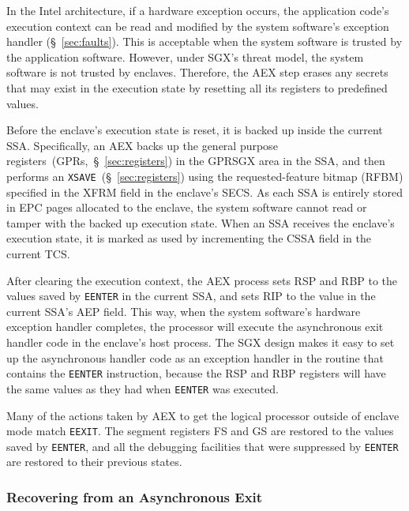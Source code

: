 In the Intel architecture, if a hardware exception occurs, the application
code's execution context can be read and modified by the system software's
exception handler (\S~\ref{sec:faults}). This is acceptable when the system
software is trusted by the application software. However, under SGX's threat
model, the system software is not trusted by enclaves. Therefore, the AEX step
erases any secrets that may exist in the execution state by resetting all its
registers to predefined values.

Before the enclave's execution state is reset, it is backed up inside the
current SSA. Specifically, an AEX backs up the general purpose
registers~(GPRs,~\S~\ref{sec:registers}) in the GPRSGX area in the SSA, and
then performs an \texttt{XSAVE}~(\S~\ref{sec:registers}) using the
requested-feature bitmap (RFBM) specified in the XFRM field in the enclave's
SECS. As each SSA is entirely stored in EPC pages allocated to the enclave, the
system software cannot read or tamper with the backed up execution state. When
an SSA receives the enclave's execution state, it is marked as used by
incrementing the CSSA field in the current TCS.

After clearing the execution context, the AEX process sets RSP and RBP to the
values saved by \texttt{EENTER} in the current SSA, and sets RIP to the value
in the current SSA's AEP field. This way, when the system software's hardware
exception handler completes, the processor will execute the asynchronous exit
handler code in the enclave's host process. The SGX design makes it easy to
set up the asynchronous handler code as an exception handler in the routine
that contains the \texttt{EENTER} instruction, because the RSP and RBP
registers will have the same values as they had when \texttt{EENTER} was
executed.

Many of the actions taken by AEX to get the logical processor outside of
enclave mode match \texttt{EEXIT}. The segment registers FS and GS are restored
to the values saved by \texttt{EENTER}, and all the debugging facilities that
were suppressed by \texttt{EENTER} are restored to their previous states.


\subsubsection{Recovering from an Asynchronous Exit}
\label{sec:sgx_eresume}

